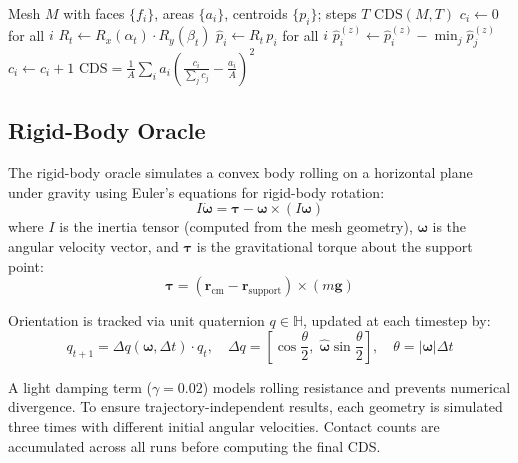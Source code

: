 \documentclass[11pt,a4paper]{article}
\begin{document}
\begin{algorithm}[h]
\caption{Approximate Oracle}
\label{alg:approx}
\begin{algorithmic}[1]
\Require Mesh $M$ with faces $\{f_i\}$, areas $\{a_i\}$, centroids $\{p_i\}$; steps $T$
\Ensure $\mathrm{CDS}(M, T)$
\State $c_i \gets 0$ for all $i$ 
  \State $R_t \gets R_x(\alpha_t) \cdot R_y(\beta_t)$ 
  \State $\hat{p}_i \gets R_t \, p_i$ for all $i$ 
  \State $\hat{p}_i^{(z)} \gets \hat{p}_i^{(z)} - \min_j \hat{p}_j^{(z)}$ 
      \State $c_i \gets c_i + 1$
    \EndIf
  \EndFor
\EndFor
\State \Return $\mathrm{CDS} = \frac{1}{A}\sum_i a_i \left(\frac{c_i}{\sum_j c_j} - \frac{a_i}{A}\right)^2$
\end{algorithmic}
\end{algorithm}

\subsection{Rigid-Body Oracle}
\label{sec:rigidbody}

The rigid-body oracle simulates a convex body rolling on a horizontal
plane under gravity using Euler's equations for rigid-body rotation:
\begin{equation}
  I\dot{\boldsymbol{\omega}} = \boldsymbol{\tau}
    - \boldsymbol{\omega} \times (I\boldsymbol{\omega})
\end{equation}
where $I$ is the inertia tensor (computed from the mesh geometry),
$\boldsymbol{\omega}$ is the angular velocity vector, and
$\boldsymbol{\tau}$ is the gravitational torque about the support point:
\begin{equation}
  \boldsymbol{\tau} = (\mathbf{r}_{\mathrm{cm}} - \mathbf{r}_{\mathrm{support}})
    \times (m\mathbf{g})
\end{equation}

Orientation is tracked via unit quaternion $q \in \mathbb{H}$, updated
at each timestep by:
\begin{equation}
  q_{t+1} = \Delta q(\boldsymbol{\omega}, \Delta t) \cdot q_t, \quad
  \Delta q = \left[\cos\frac{\theta}{2},\;
    \hat{\boldsymbol{\omega}}\sin\frac{\theta}{2}\right], \quad
  \theta = |\boldsymbol{\omega}|\Delta t
\end{equation}

A light damping term ($\gamma = 0.02$) models rolling resistance and
prevents numerical divergence. To ensure trajectory-independent results,
each geometry is simulated three times with different initial angular
velocities. Contact counts are accumulated across all runs before
computing the final CDS.
\end{document}
